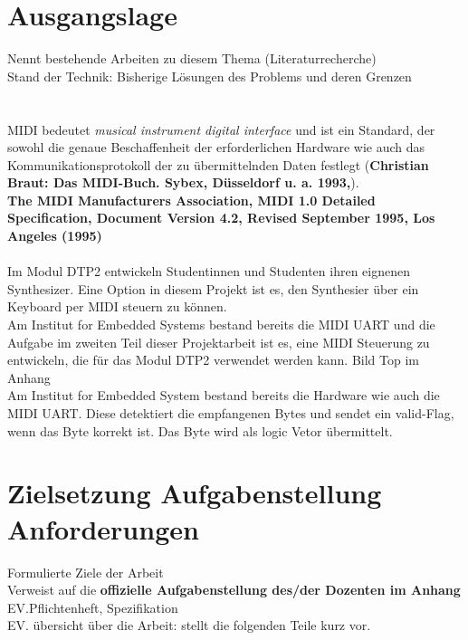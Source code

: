 \section{Ausgangslage}\label{sect.einleitung_ausgangslage}
Nennt bestehende Arbeiten zu diesem Thema (Literaturrecherche)\\
Stand der Technik: Bisherige Lösungen des Problems und deren Grenzen\\
\\
\\
MIDI bedeutet \textit{musical instrument digital interface} und ist ein Standard, der sowohl die genaue Beschaffenheit der erforderlichen Hardware wie auch das Kommunikationsprotokoll der zu übermittelnden Daten festlegt (\textbf{Christian Braut: Das MIDI-Buch. Sybex, Düsseldorf u. a. 1993,}).\\
\textbf{The MIDI Manufacturers Association, MIDI 1.0 Detailed Specification, Document Version 4.2, Revised September 1995, Los Angeles (1995) }\\
\\
Im Modul DTP2 entwickeln Studentinnen und Studenten ihren eignenen Synthesizer. Eine Option in diesem Projekt ist es, den Synthesier über ein Keyboard per MIDI steuern zu können. \\
Am Institut for Embedded Systems bestand bereits die MIDI UART und die Aufgabe im zweiten Teil dieser Projektarbeit ist es, eine MIDI Steuerung zu entwickeln, die für das Modul DTP2 verwendet werden kann. Bild Top im Anhang\\
Am Institut for Embedded System bestand bereits die Hardware wie auch die MIDI UART. Diese detektiert die empfangenen Bytes und sendet ein valid-Flag, wenn das Byte korrekt ist. Das Byte wird als logic Vetor übermittelt.\\


\section{Zielsetzung Aufgabenstellung Anforderungen}\label{sect.einleitung_ziele}
Formulierte Ziele der Arbeit\\
Verweist auf die \textbf{offizielle Aufgabenstellung des/der Dozenten im Anhang}\\
EV.Pflichtenheft, Spezifikation\\
EV. übersicht über die Arbeit: stellt die folgenden Teile kurz vor.\\


